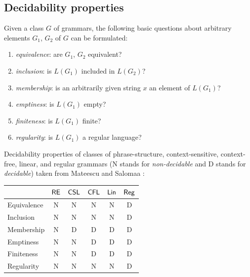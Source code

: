 \subsection{Decidability properties}
\label{subsection:decidability-properties}

Given a class $G$ of grammars, the following basic questions about arbitrary
elements $G_1$, $G_2$ of $G$ can be formulated:

\begin{enumerate}
\item {}\emph{equivalence}: are $G_1$, $G_2$ equivalent?
\item {}\emph{inclusion}: is $L(G_1)$ included in $L(G_2)$?
\item {}\emph{membership}: is an arbitrarily given string $x$ an 
element of $L(G_1)$?
\item {}\emph{emptiness}: is $L(G_1)$ empty?
\item {}\emph{finiteness}: is $L(G_1)$ finite?
\item {}\emph{regularity}: is $L(G_1)$ a regular language?
\end{enumerate}

Decidability properties of classes of phrase-structure, 
context-sensitive, context-free, linear, and regular grammars (N stands for 
\emph{non-decidable} and D stands for \emph{decidable}) taken from 
Mateescu and Salomaa \cite{MaSa1997formal}:

\begin{center}
\begin{tabular}{ | l | c | c | c | c | c | }
\hline
              & \index{$\RE$}$\RE$ 
              & \index{$\CSL$}$\CSL$ 
              & \index{$\CFL$}$\CFL$ 
              & \index{$\Lin$}$\Lin$ 
              & \index{$\Reg$}$\Reg$\\
\hline
\index{equivalence}Equivalence
              & N     & N      & N      & N      & D \\
\hline
\index{inclusion}Inclusion
              & N     & N      & N      & N      & D \\
\hline
\index{membership}Membership
              & N     & D      & D      & D      & D \\
\hline
\index{emptiness}Emptiness
              & N     & N      & D      & D      & D \\
\hline
\index{finiteness}Finiteness
              & N     & N      & D      & D      & D \\
\hline
\index{regularity}Regularity
              & N     & N      & N      & N      & D \\
\hline
\end{tabular}
\end{center}

